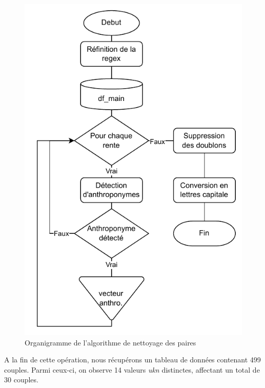  \begin{figure} %
    \centering
    \includegraphics[scale=0.75]{3.Results/Img/clean_df_links.drawio.pdf}
    \caption{Organigramme de l'algorithme de nettoyage des paires}
    \label{schemaNettoyageRelations}
\end{figure}
 
 A la fin de cette opération, nous récupérons  un tableau de données contenant 499 couples. Parmi ceux-ci, on observe 14 valeurs \textit{ukn} distinctes, affectant un total de 30 couples.

